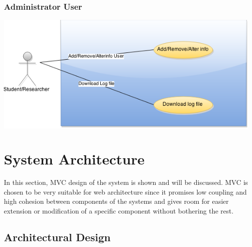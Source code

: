 \subsubsection{Administrator User} 
\begin{center}
\includegraphics[scale=0.3]{./img/dsgn_img/USECASE3.png}
	
\end{center}


\section{System Architecture} %
\label{sec:system_architecture}
 In this section, MVC design of the system is shown and will be discussed. MVC is chosen to be very suitable for web architecture since it promises low coupling and high cohesion between components of the systems and gives room for easier extension or modification of a specific component without bothering the rest.
\subsection{Architectural Design} %
\label{sub:arichtectural_design}

